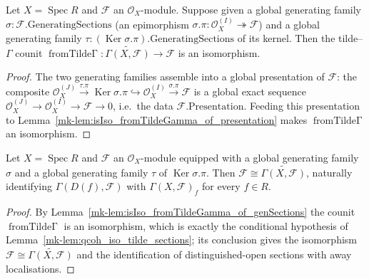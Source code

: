 \begin{lemma}\label{mk-lem:isIso_fromTildeGamma_of_genSections}
  \leanok

  Let \(X = \operatorname{Spec} R\) and \(\mathcal{F}\) an \(\mathcal{O}_X\)-module.
  Suppose given a global generating family
  \(\sigma : \mathcal{F}.\mathrm{GeneratingSections}\) (an epimorphism
  \(\sigma.\pi : \mathcal{O}_X^{(I)} \twoheadrightarrow \mathcal{F}\)) and a global
  generating family \(\tau : (\operatorname{Ker} \sigma.\pi).\mathrm{GeneratingSections}\)
  of its kernel. Then the tilde--\(\Gamma\) counit
  \(\operatorname{fromTilde\Gamma} : \widetilde{\Gamma(X, \mathcal{F})} \to \mathcal{F}\)
  is an isomorphism.
\end{lemma}
\begin{proof}
  \leanok
  The two generating families assemble into a global presentation of \(\mathcal{F}\): the
  composite \(\mathcal{O}_X^{(J)} \xrightarrow{\tau.\pi} \operatorname{Ker} \sigma.\pi
  \hookrightarrow \mathcal{O}_X^{(I)} \xrightarrow{\sigma.\pi} \mathcal{F}\) is a global
  exact sequence \(\mathcal{O}_X^{(J)} \to \mathcal{O}_X^{(I)} \to \mathcal{F} \to 0\),
  i.e.\ the data \(\mathcal{F}.\mathrm{Presentation}\). Feeding this presentation to
  Lemma~\ref{mk-lem:isIso_fromTildeGamma_of_presentation} makes
  \(\operatorname{fromTilde\Gamma}\) an isomorphism.
\end{proof}

\begin{lemma}\label{mk-lem:qcoh_iso_tilde_sections_of_genSections}
  \leanok

  Let \(X = \operatorname{Spec} R\) and \(\mathcal{F}\) an \(\mathcal{O}_X\)-module
  equipped with a global generating family \(\sigma\) and a global generating family
  \(\tau\) of \(\operatorname{Ker} \sigma.\pi\). Then \(\mathcal{F} \cong
  \widetilde{\Gamma(X, \mathcal{F})}\), naturally identifying
  \(\Gamma(D(f), \mathcal{F})\) with \(\Gamma(X, \mathcal{F})_f\) for every \(f \in R\).
\end{lemma}
\begin{proof}
  \leanok
  By Lemma~\ref{mk-lem:isIso_fromTildeGamma_of_genSections} the counit
  \(\operatorname{fromTilde\Gamma}\) is an isomorphism, which is exactly the conditional
  hypothesis of Lemma~\ref{mk-lem:qcoh_iso_tilde_sections}; its conclusion gives the
  isomorphism \(\mathcal{F} \cong \widetilde{\Gamma(X, \mathcal{F})}\) and the
  identification of distinguished-open sections with away localisations.
\end{proof}

